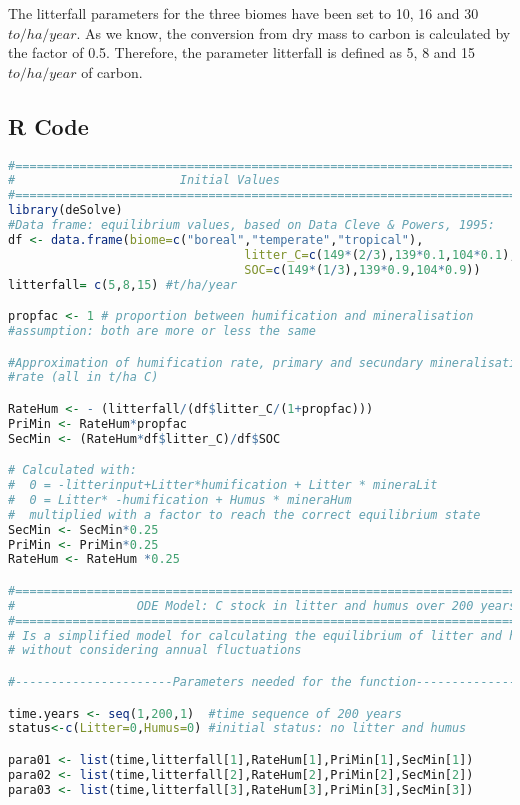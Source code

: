 \documentclass[10pt, a4paper]{article}
\begin{document}
The litterfall parameters for the three biomes have been set to 10, 16 and 30 $to/ha/year$. As we know, the conversion from dry mass to carbon is calculated by the factor of 0.5. Therefore, the parameter litterfall is defined as 5, 8 and 15 $to/ha/year$ of carbon. 

\subsection{R Code}
\begin{lstlisting}[language=R]
#=============================================================================
#                       Initial Values
#=============================================================================
library(deSolve)
#Data frame: equilibrium values, based on Data Cleve & Powers, 1995:
df <- data.frame(biome=c("boreal","temperate","tropical"),
							 	 litter_C=c(149*(2/3),139*0.1,104*0.1),
								 SOC=c(149*(1/3),139*0.9,104*0.9))
litterfall= c(5,8,15) #t/ha/year

propfac <- 1 # proportion between humification and mineralisation  
#assumption: both are more or less the same

#Approximation of humification rate, primary and secundary mineralisation 
#rate (all in t/ha C)

RateHum <- - (litterfall/(df$litter_C/(1+propfac)))  
PriMin <- RateHum*propfac
SecMin <- (RateHum*df$litter_C)/df$SOC

# Calculated with: 
#  0 = -litterinput+Litter*humification + Litter * mineraLit 
#  0 = Litter* -humification + Humus * mineraHum
#  multiplied with a factor to reach the correct equilibrium state
SecMin <- SecMin*0.25
PriMin <- PriMin*0.25
RateHum <- RateHum *0.25

#=============================================================================
#                 ODE Model: C stock in litter and humus over 200 years
#=============================================================================
# Is a simplified model for calculating the equilibrium of litter and humus 
# without considering annual fluctuations

#----------------------Parameters needed for the function----------------

time.years <- seq(1,200,1)  #time sequence of 200 years
status<-c(Litter=0,Humus=0) #initial status: no litter and humus 

para01 <- list(time,litterfall[1],RateHum[1],PriMin[1],SecMin[1])
para02 <- list(time,litterfall[2],RateHum[2],PriMin[2],SecMin[2])
para03 <- list(time,litterfall[3],RateHum[3],PriMin[3],SecMin[3])


\end{lstlisting}
\end{document}
